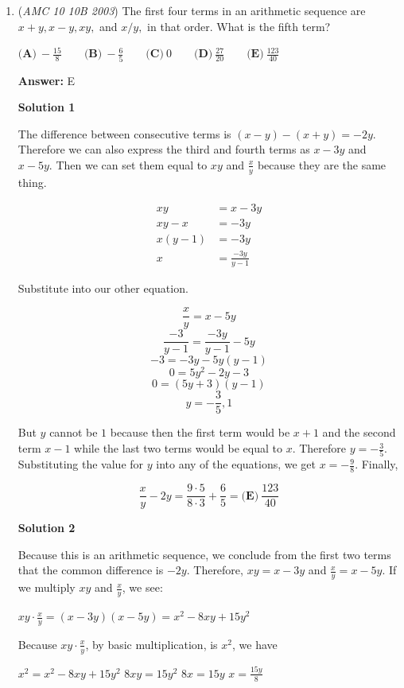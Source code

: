 \begin{enumerate}
 


	\item (\textit{AMC 10 10B 2003}) The first four terms in an arithmetic sequence are $x + y, x - y, xy,$ and $x/y,$ in that order. What is the ﬁfth term? 


 $\textbf{(A)}\ -\frac{15}{8}\qquad\textbf{(B)}\ -\frac{6}{5}\qquad\textbf{(C)}\ 0\qquad\textbf{(D)}\ \frac{27}{20}\qquad\textbf{(E)}\ \frac{123}{40}$

 \textbf{Answer: }E



\textbf{Solution 1}

The difference between consecutive terms is $(x-y)-(x+y)=-2y.$ Therefore we can also express the third and fourth terms as $x-3y$ and $x-5y.$ Then we can set them equal to $xy$ and $\frac{x}{y}$ because they are the same thing.

 
 \begin{align*} xy&=x-3y\\ xy-x&=-3y\\ x(y-1)&=-3y\\ x&=\frac{-3y}{y-1} \end{align*}


 Substitute into our other equation.

 
 \[\frac{x}{y}=x-5y\]
 \[\frac{-3}{y-1}=\frac{-3y}{y-1}-5y\]
 \[-3=-3y-5y(y-1)\]
 \[0=5y^2-2y-3\]
 \[0=(5y+3)(y-1)\]
 \[y=-\frac35, 1\]

 But $y$ cannot be $1$ because then the first term would be $x+1$ and the second term $x-1$ while the last two terms would be equal to $x.$ Therefore $y=-\frac35.$ Substituting the value for $y$ into any of the equations, we get $x=-\frac98.$ Finally,

 
 \[\frac{x}{y}-2y=\frac{9\cdot 5}{8\cdot 3}+\frac{6}{5}=\boxed{\textbf{(E)}\ \frac{123}{40}}\]




\textbf{Solution 2}

Because this is an arithmetic sequence, we conclude from the first two terms that the common difference is $-2y$. Therefore, $xy = x-3y$ and $\frac{x}{y}=x-5y$. If we multiply $xy$ and $\frac{x}{y}$, we see: 

 $xy\cdot\frac{x}{y} = (x-3y)(x-5y) = x^2 - 8xy + 15y^2$

 Because $xy\cdot\frac{x}{y}$, by basic multiplication, is $x^2$, we have 

 $x^2 = x^2 - 8xy + 15y^2$
$8xy = 15y^2$
$8x = 15y$
$x = \frac{15y}{8}$


\end{enumerate}
